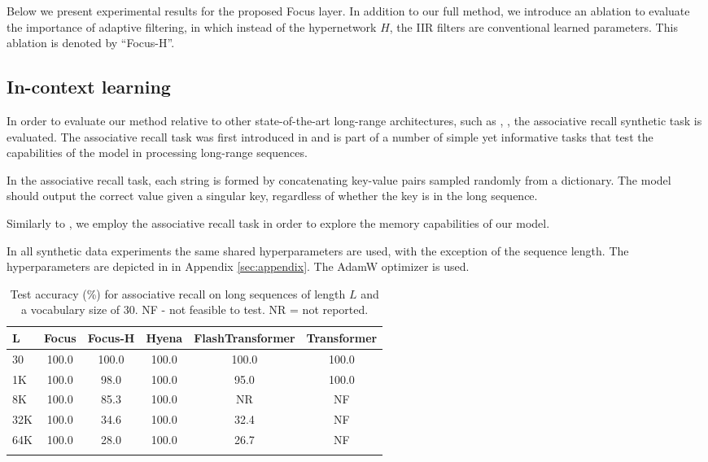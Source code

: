 \documentclass[11pt]{article}
\begin{document}
Below we present experimental results for the proposed Focus layer. In addition to our full method, we introduce an ablation to evaluate the importance of adaptive filtering, in which instead of the hypernetwork $H$, the IIR filters are conventional learned parameters. This ablation is denoted by ``Focus-H''.
\subsection{In-context learning}
 In order to evaluate our method relative to other state-of-the-art long-range architectures, such as \cite{poli2023hyena}, \cite{dai2019transformer}, the associative recall synthetic task is evaluated. The associative recall task was first introduced in \cite{elhage2021mathematical} and is part of a number of simple yet informative tasks that test the capabilities of the model in processing long-range sequences.

In the associative recall task, each string is formed by concatenating key-value pairs sampled randomly from a dictionary. The model should output the correct value given a singular key, regardless of whether the key is in the long sequence.

Similarly to \citet{poli2023hyena}, we employ the associative recall task in order to explore the memory capabilities of our model. 

In all synthetic data experiments the same shared hyperparameters are used, with the exception of the sequence length. The hyperparameters are depicted in {in Appendix \ref{sec:appendix}}. The AdamW optimizer \citep{loshchilov2017fixing} is used.



\begin{table*}[t]
\centering
\caption{Test accuracy (\%) for associative recall on long sequences of length $L$ and a vocabulary size of 30. NF - not feasible to test. NR = not reported. }\begin{tabular}{lccccc}\toprule
L & Focus & Focus-H&Hyena &FlashTransformer &Transformer \\
\midrule
30 & 100.0 & 100.0 & 100.0 & 100.0 & 100.0\\
1K & 100.0 & 98.0 & 100.0& 95.0&100.0\\
8K & 100.0 & 85.3& 100.0 &NR& NF\\
32K & 100.0& 34.6&100.0 & 32.4& NF\\
64K & 100.0& 28.0&100.0 & 26.7 & NF\\
\bottomrule
\label{tab:synth}
\end{tabular}
\end{table*}
\end{document}
